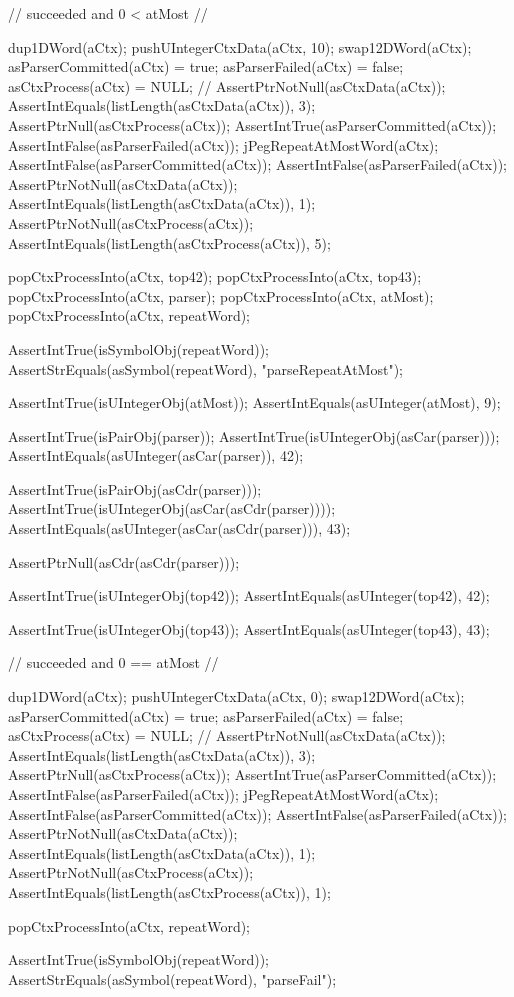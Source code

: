   // succeeded and 0 < atMost 
  //
  {
  dup1DWord(aCtx);
  pushUIntegerCtxData(aCtx, 10);
  swap12DWord(aCtx);
  asParserCommitted(aCtx) = true;
  asParserFailed(aCtx) = false;
  asCtxProcess(aCtx) = NULL;
  //
  AssertPtrNotNull(asCtxData(aCtx));
  AssertIntEquals(listLength(asCtxData(aCtx)), 3);
  AssertPtrNull(asCtxProcess(aCtx));
  AssertIntTrue(asParserCommitted(aCtx));
  AssertIntFalse(asParserFailed(aCtx));
  jPegRepeatAtMostWord(aCtx);
  AssertIntFalse(asParserCommitted(aCtx));
  AssertIntFalse(asParserFailed(aCtx));
  AssertPtrNotNull(asCtxData(aCtx));
  AssertIntEquals(listLength(asCtxData(aCtx)), 1);
  AssertPtrNotNull(asCtxProcess(aCtx));
  AssertIntEquals(listLength(asCtxProcess(aCtx)), 5);
    
  popCtxProcessInto(aCtx, top42);
  popCtxProcessInto(aCtx, top43);
  popCtxProcessInto(aCtx, parser);
  popCtxProcessInto(aCtx, atMost);
  popCtxProcessInto(aCtx, repeatWord);
  
  AssertIntTrue(isSymbolObj(repeatWord));
  AssertStrEquals(asSymbol(repeatWord), "parseRepeatAtMost");
  
  AssertIntTrue(isUIntegerObj(atMost));
  AssertIntEquals(asUInteger(atMost), 9);
  
  AssertIntTrue(isPairObj(parser));
  AssertIntTrue(isUIntegerObj(asCar(parser)));
  AssertIntEquals(asUInteger(asCar(parser)), 42);
  
  AssertIntTrue(isPairObj(asCdr(parser)));
  AssertIntTrue(isUIntegerObj(asCar(asCdr(parser))));
  AssertIntEquals(asUInteger(asCar(asCdr(parser))), 43);
  
  AssertPtrNull(asCdr(asCdr(parser)));
  
  AssertIntTrue(isUIntegerObj(top42));
  AssertIntEquals(asUInteger(top42), 42);  

  AssertIntTrue(isUIntegerObj(top43));
  AssertIntEquals(asUInteger(top43), 43);
  }

  // succeeded and 0 == atMost 
  //
  {
  dup1DWord(aCtx);
  pushUIntegerCtxData(aCtx, 0);
  swap12DWord(aCtx);
  asParserCommitted(aCtx) = true;
  asParserFailed(aCtx) = false;
  asCtxProcess(aCtx) = NULL;
  //
  AssertPtrNotNull(asCtxData(aCtx));
  AssertIntEquals(listLength(asCtxData(aCtx)), 3);
  AssertPtrNull(asCtxProcess(aCtx));
  AssertIntTrue(asParserCommitted(aCtx));
  AssertIntFalse(asParserFailed(aCtx));
  jPegRepeatAtMostWord(aCtx);
  AssertIntFalse(asParserCommitted(aCtx));
  AssertIntFalse(asParserFailed(aCtx));
  AssertPtrNotNull(asCtxData(aCtx));
  AssertIntEquals(listLength(asCtxData(aCtx)), 1);
  AssertPtrNotNull(asCtxProcess(aCtx));
  AssertIntEquals(listLength(asCtxProcess(aCtx)), 1);
    
  popCtxProcessInto(aCtx, repeatWord);
  
  AssertIntTrue(isSymbolObj(repeatWord));
  AssertStrEquals(asSymbol(repeatWord), "parseFail");
  }
\stopCTest
\stopTestCase
\stopTestSuite

